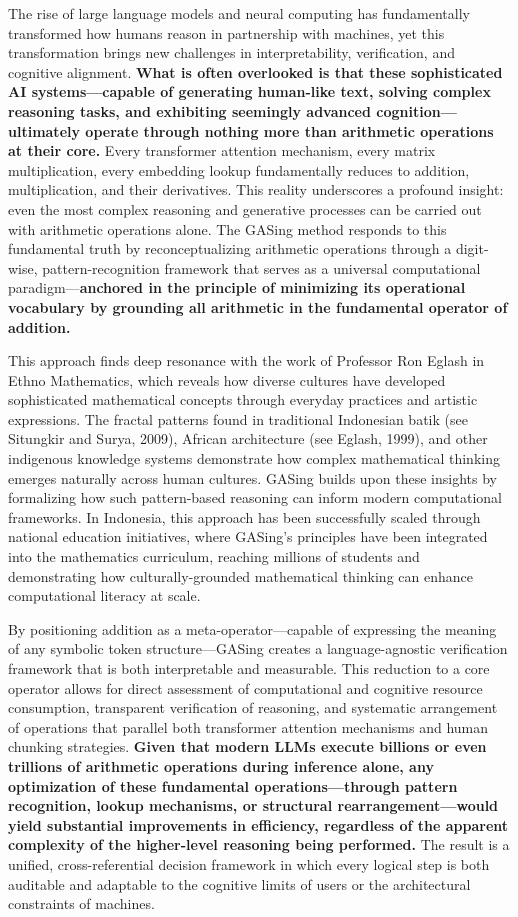 The rise of large language models and neural computing has fundamentally transformed how humans reason in partnership with machines, yet this transformation brings new challenges in interpretability, verification, and cognitive alignment. \textbf{What is often overlooked is that these sophisticated AI systems—capable of generating human-like text, solving complex reasoning tasks, and exhibiting seemingly advanced cognition—ultimately operate through nothing more than arithmetic operations at their core.} Every transformer attention mechanism, every matrix multiplication, every embedding lookup fundamentally reduces to addition, multiplication, and their derivatives. This reality underscores a profound insight: even the most complex reasoning and generative processes can be carried out with arithmetic operations alone. The GASing method responds to this fundamental truth by reconceptualizing arithmetic operations through a digit-wise, pattern-recognition framework that serves as a universal computational paradigm—\textbf{anchored in the principle of minimizing its operational vocabulary by grounding all arithmetic in the fundamental operator of addition.}

This approach finds deep resonance with the work of Professor Ron Eglash in Ethno Mathematics, which reveals how diverse cultures have developed sophisticated mathematical concepts through everyday practices and artistic expressions. The fractal patterns found in traditional Indonesian batik (see Situngkir and Surya, 2009), African architecture (see Eglash, 1999), and other indigenous knowledge systems demonstrate how complex mathematical thinking emerges naturally across human cultures. GASing builds upon these insights by formalizing how such pattern-based reasoning can inform modern computational frameworks. In Indonesia, this approach has been successfully scaled through national education initiatives, where GASing's principles have been integrated into the mathematics curriculum, reaching millions of students and demonstrating how culturally-grounded mathematical thinking can enhance computational literacy at scale.

By positioning addition as a meta-operator—capable of expressing the meaning of any symbolic token structure—GASing creates a language-agnostic verification framework that is both interpretable and measurable. This reduction to a core operator allows for direct assessment of computational and cognitive resource consumption, transparent verification of reasoning, and systematic arrangement of operations that parallel both transformer attention mechanisms and human chunking strategies. \textbf{Given that modern LLMs execute billions or even trillions of arithmetic operations during inference alone, any optimization of these fundamental operations—through pattern recognition, lookup mechanisms, or structural rearrangement—would yield substantial improvements in efficiency, regardless of the apparent complexity of the higher-level reasoning being performed.} The result is a unified, cross-referential decision framework in which every logical step is both auditable and adaptable to the cognitive limits of users or the architectural constraints of machines.

